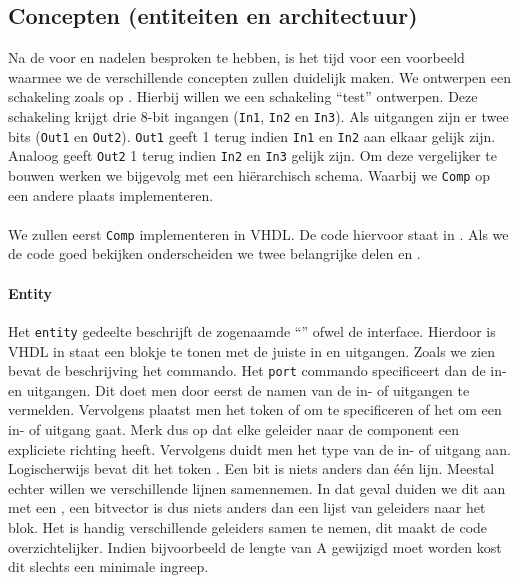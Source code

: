 \subsection{Concepten (entiteiten en architectuur)}
Na de voor en nadelen besproken te hebben, is het tijd voor een voorbeeld waarmee we de verschillende concepten zullen duidelijk maken. We ontwerpen een schakeling zoals op . Hierbij willen we een schakeling ``test'' ontwerpen. Deze schakeling krijgt drie 8-bit ingangen (\texttt{In1}, \texttt{In2} en \texttt{In3}). Als uitgangen zijn er twee bits (\texttt{Out1} en \texttt{Out2}). \texttt{Out1} geeft 1 terug indien \texttt{In1} en \texttt{In2} aan elkaar gelijk zijn. Analoog geeft \texttt{Out2} 1 terug indien \texttt{In2} en \texttt{In3} gelijk zijn. Om deze vergelijker te bouwen werken we bijgevolg met een hi\"erarchisch schema. Waarbij we \texttt{Comp} op een andere plaats implementeren.
\paragraph{}We zullen eerst \texttt{Comp} implementeren in VHDL. De code hiervoor staat in . Als we de code goed bekijken onderscheiden we twee belangrijke delen  en .
\paragraph{Entity}
Het \texttt{entity} gedeelte beschrijft de zogenaamde ``'' ofwel de interface. Hierdoor is VHDL in staat een blokje te tonen met de juiste in en uitgangen. Zoals we zien bevat de beschrijving het  commando. Het \texttt{port} commando specificeert dan de in- en uitgangen. Dit doet men door eerst de namen van de in- of uitgangen te vermelden. Vervolgens plaatst men het token  of  om te specificeren of het om een in- of uitgang gaat. Merk dus op dat elke geleider naar de component een expliciete richting heeft. Vervolgens duidt men het type van de in- of uitgang aan. Logischerwijs bevat dit het token . Een bit is niets anders dan \'e\'en lijn. Meestal echter willen we verschillende lijnen samennemen. In dat geval duiden we dit aan met een , een bitvector is dus niets anders dan een lijst van geleiders naar het blok. Het is handig verschillende geleiders samen te nemen, dit maakt de code overzichtelijker. Indien bijvoorbeeld de lengte van A gewijzigd moet worden kost dit slechts een minimale ingreep.
